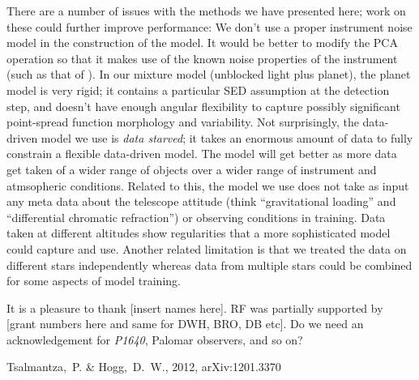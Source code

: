 \documentclass[12pt,pdftex,preprint]{aastex}
\newcommand{\project}[1]{\textsl{#1}}
\begin{document}
There are a number of issues with the methods we have presented here;
work on these could further improve performance: We don't use a proper
instrument noise model in the construction of the model.  It would be
better to modify the PCA operation so that it makes use of the known
noise properties of the instrument (such as that of \citealt{hmf}).
In our mixture model (unblocked light plus planet), the planet model
is very rigid; it contains a particular SED assumption at the
detection step, and doesn't have enough angular flexibility to capture
possibly significant point-spread function morphology and variability.
Not surprisingly, the data-driven model we use is \emph{data starved};
it takes an enormous amount of data to fully constrain a flexible
data-driven model.  The model will get better as more data get taken
of a wider range of objects over a wider range of instrument and
atmsopheric conditions.  Related to this, the model we use does not
take as input any meta data about the telescope attitude (think
``gravitational loading'' and ``differential chromatic refraction'')
or observing conditions in training.  Data taken at different
altitudes show regularities that a more sophisticated model could
capture and use.  Another related limitation is that we treated the
data on different stars independently whereas data from multiple stars
could be combined for some aspects of model training.

\acknowledgements It is a pleasure to thank [insert names here].  RF
was partially supported by [grant numbers here and same for DWH, BRO,
  DB etc].  Do we need an acknowledgement for \project{P1640}, Palomar
observers, and so on?

\begin{thebibliography}{}
Tsalmantza,~P. \& Hogg,~D.~W., 2012, arXiv:1201.3370
\end{thebibliography}
\end{document}
